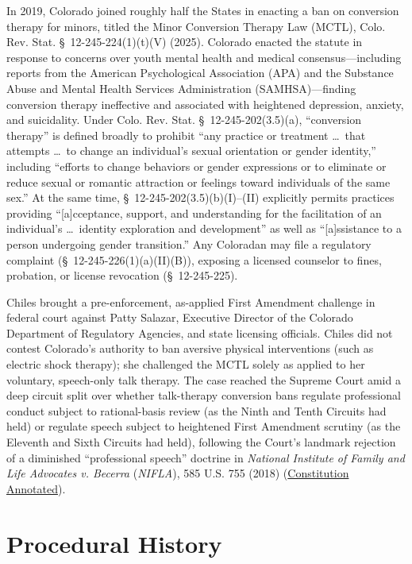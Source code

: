\documentclass[12pt]{article}
\begin{document}
In 2019, Colorado joined roughly half the States in enacting a ban on conversion therapy for minors, titled the Minor Conversion Therapy Law (MCTL), Colo. Rev. Stat. \S~12-245-224(1)(t)(V) (2025). Colorado enacted the statute in response to concerns over youth mental health and medical consensus---including reports from the American Psychological Association (APA) and the Substance Abuse and Mental Health Services Administration (SAMHSA)---finding conversion therapy ineffective and associated with heightened depression, anxiety, and suicidality. Under Colo. Rev. Stat. \S~12-245-202(3.5)(a), ``conversion therapy'' is defined broadly to prohibit ``any practice or treatment \ldots\ that attempts \ldots\ to change an individual's sexual orientation or gender identity,'' including ``efforts to change behaviors or gender expressions or to eliminate or reduce sexual or romantic attraction or feelings toward individuals of the same sex.'' At the same time, \S~12-245-202(3.5)(b)(I)--(II) explicitly permits practices providing ``[a]cceptance, support, and understanding for the facilitation of an individual's \ldots\ identity exploration and development'' as well as ``[a]ssistance to a person undergoing gender transition.'' Any Coloradan may file a regulatory complaint (\S~12-245-226(1)(a)(II)(B)), exposing a licensed counselor to fines, probation, or license revocation (\S~12-245-225).

Chiles brought a pre-enforcement, as-applied First Amendment challenge in federal court against Patty Salazar, Executive Director of the Colorado Department of Regulatory Agencies, and state licensing officials. Chiles did not contest Colorado's authority to ban aversive physical interventions (such as electric shock therapy); she challenged the MCTL solely as applied to her voluntary, speech-only talk therapy. The case reached the Supreme Court amid a deep circuit split over whether talk-therapy conversion bans regulate professional conduct subject to rational-basis review (as the Ninth and Tenth Circuits had held) or regulate speech subject to heightened First Amendment scrutiny (as the Eleventh and Sixth Circuits had held), following the Court's landmark rejection of a diminished ``professional speech'' doctrine in \textit{National Institute of Family and Life Advocates v. Becerra} (\textit{NIFLA}), 585 U.S. 755 (2018) (\href{https://constitution.congress.gov/browse/essay/intro.9-4-1/ALDE_00000126/}{Constitution Annotated}).

\section{Procedural History}
\end{document}
